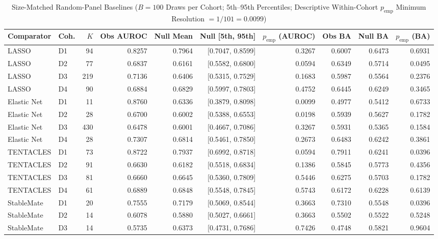 \begin{table}[!htbp]
\centering
\caption{Size-Matched Random-Panel Baselines ($B=100$ Draws per Cohort; 5th--95th Percentiles; Descriptive Within-Cohort $p_{\mathrm{emp}}$ Minimum Resolution $= 1/101 = 0.0099$)}
\label{tab:s3}
\footnotesize
\setlength{\tabcolsep}{3.8pt}
\renewcommand{\arraystretch}{1.10}
\begin{tabular}{@{}llrrrrrrrr@{}}
\toprule
Comparator & Coh. & $K$ & Obs AUROC & Null Mean & Null [5th, 95th] & $p_{\mathrm{emp}}$ (AUROC) & Obs BA & Null BA & $p_{\mathrm{emp}}$ (BA) \\
\midrule
LASSO & D1 & 94 & 0.8257 & 0.7964 & [0.7047, 0.8599] & 0.3267 & 0.6007 & 0.6473 & 0.6931 \\
LASSO & D2 & 77 & 0.6837 & 0.6161 & [0.5582, 0.6800] & 0.0594 & 0.6349 & 0.5714 & 0.0495 \\
LASSO & D3 & 219 & 0.7136 & 0.6406 & [0.5315, 0.7529] & 0.1683 & 0.5987 & 0.5564 & 0.2376 \\
LASSO & D4 & 90 & 0.6884 & 0.6829 & [0.5997, 0.7803] & 0.4752 & 0.6445 & 0.6249 & 0.3465 \\
\midrule
Elastic Net & D1 & 11 & 0.8760 & 0.6336 & [0.3879, 0.8098] & 0.0099 & 0.4977 & 0.5412 & 0.6733 \\
Elastic Net & D2 & 28 & 0.6700 & 0.6002 & [0.5388, 0.6553] & 0.0198 & 0.5939 & 0.5627 & 0.1782 \\
Elastic Net & D3 & 430 & 0.6478 & 0.6001 & [0.4667, 0.7086] & 0.3267 & 0.5931 & 0.5365 & 0.1584 \\
Elastic Net & D4 & 28 & 0.7307 & 0.6814 & [0.5461, 0.7850] & 0.2673 & 0.6483 & 0.6242 & 0.3861 \\
\midrule
TENTACLES & D1 & 73 & 0.8722 & 0.7937 & [0.6992, 0.8718] & 0.0594 & 0.7911 & 0.6241 & 0.0396 \\
TENTACLES & D2 & 91 & 0.6630 & 0.6182 & [0.5518, 0.6834] & 0.1386 & 0.5845 & 0.5773 & 0.4356 \\
TENTACLES & D3 & 81 & 0.6660 & 0.6645 & [0.5360, 0.7809] & 0.5446 & 0.6275 & 0.5703 & 0.1782 \\
TENTACLES & D4 & 61 & 0.6889 & 0.6848 & [0.5548, 0.7845] & 0.5743 & 0.6172 & 0.6228 & 0.6139 \\
\midrule
StableMate & D1 & 20 & 0.7555 & 0.7179 & [0.5069, 0.8544] & 0.3663 & 0.7310 & 0.5548 & 0.0396 \\
StableMate & D2 & 14 & 0.6078 & 0.5880 & [0.5027, 0.6661] & 0.3663 & 0.5502 & 0.5522 & 0.5248 \\
StableMate & D3 & 14 & 0.5735 & 0.6373 & [0.4731, 0.7686] & 0.7426 & 0.4748 & 0.5821 & 0.9604 \\

\end{tabular}
\end{table}
